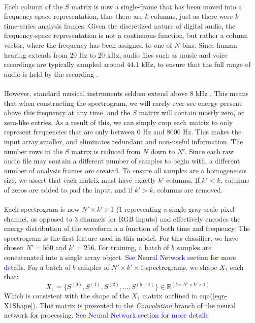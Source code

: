 \documentclass[12pt,letterpaper]{article}
\begin{document}
\paragraph*{}Each column of the $S$ matrix is now a single-frame that has been moved into a frequency-space representation, thus there are $k$ columns, just as there were $k$ time-series analysis frames. Given the discretized nature of digital audio, the frequency-space representation is not a continuous function, but rather a column vector, where the frequency has been assigned to one of $N$ bins. Since human hearing extends from $20$ Hz to $20$ kHz, audio files such as music and voice recordings are typically sampled around $44.1$ kHz, to ensure that the full range of audio is held by the recording \cite{Olson,Virtanen}. 

\paragraph*{}However, standard musical instruments seldom extend above $8$ kHz \cite{Olson,Virtanen,White}. This means that when constructing the spectrogram, we will rarely ever see energy present above this frequency at any time, and the $S$ matrix will contain mostly zero, or zero-like entries. As a result of this, we can simply crop each matrix to only represent frequencies that are only between $0$ Hz and $8000$ Hz. This makes the input array smaller, and eliminates redundant and non-useful information. The number rows in the $S$ matrix is reduced from $N$ down to $N'$. Since each raw audio file may contain a different number of samples to begin with, a different number of analysis frames are created. To ensure all samples are a homogeneous size, we assert that each matrix must have exactly $k'$ columns. If $k' < k$, columns of zeros are added to pad the input, and if $k' > k$, columns are removed.

\paragraph*{}Each spectrogram is now $N' \times k' \times 1$ ($1$ representing a single gray-scale pixel channel, as opposed to $3$ channels for RGB inputs) and effectively encodes the energy distribution of the waveform a a function of both time and frequency. The spectrogram is the first feature used in this model. For this classifier, we have chosen $N' = 560$ and $k' = 256$. For training, a batch of $b$ samples are concatenated into a single array object. \textcolor{blue}{See Neural Network section for more details}. For a batch of $b$ samples of $N' \times k' \times 1$ spectrograms, we shape $X_1$ such that:
\begin{equation}
\label{eqn-X1 shape}
X_1 = \big\{ S^{(0)},S^{(1)},S^{(2)}, ... , S^{(b-1)} \big\} \in \mathbb{R}^{(b \times N' \times k' \times 1)}
\end{equation}
Which is consistent with the shape of the $X_1$ matrix outlined in eqn(\ref{eqn-X1Shape}). This matrix is presented to the \textit{Convolution} branch of the neural network for processing. \textcolor{blue}{See Neural Network section for more details}
\end{document}
